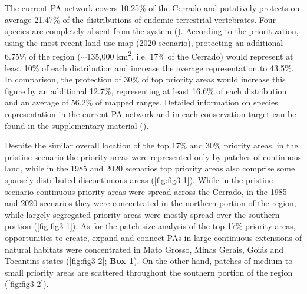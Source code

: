\documentclass[12pt,openright,oneside,a4paper,english]{abntex2}
\begin{document}
The current PA network covers 10.25\% of the Cerrado and putatively protects on average 21.47\% of the distributions of endemic terrestrial vertebrates. Four species are completely absent from the system (). According to the prioritization, using the most recent land-use map (2020 scenario), protecting an additional 6.75\% of the region ($\sim$135,000 km\textsuperscript{2}, i.e. 17\% of the Cerrado) would represent at least 10\% of each distribution and increase the average representation to 43.5\%. In comparison, the protection of 30\% of top priority areas would increase this figure by an additional 12.7\%, representing at least 16.6\% of each distribution and an average of 56.2\% of mapped ranges. Detailed information on species representation in the current PA network and in each conservation target can be found in the supplementary material ().

Despite the similar overall location of the top 17\% and 30\% priority areas, in the pristine scenario the priority areas were represented only by patches of continuous land, while in the 1985 and 2020 scenarios top priority areas also comprise some sparsely distributed discontinuous areas (\autoref{fig:fig3-1}). While in the pristine scenario continuous priority areas were spread across the Cerrado, in the 1985 and 2020 scenarios they were concentrated in the northern portion of the region, while largely segregated priority areas were mostly spread over the southern portion (\autoref{fig:fig3-1}). As for the patch size analysis of the top 17\% priority areas, opportunities to create, expand and connect PAs in large continuous extensions of natural habitats were concentrated in Mato Grosso, Minas Gerais, Goiás and Tocantins states (\autoref{fig:fig3-2}; \textbf{Box 1}). On the other hand, patches of medium to small priority areas are scattered throughout the southern portion of the region (\autoref{fig:fig3-2}).
\end{document}

